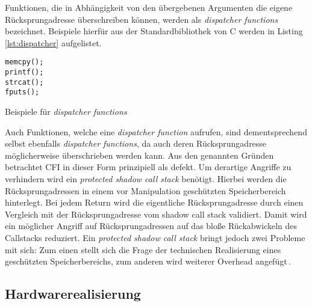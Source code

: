 Funktionen, die in Abhängigkeit von den übergebenen Argumenten die eigene Rücksprungadresse überschreiben können, werden als \emph{dispatcher functions} bezeichnet. Beispiele hierfür aus der Standardbibliothek von C werden in Listing \ref{lst:dispatcher} aufgelistet.
\begin{listing}[ht!]
\begin{verbatim}
memcpy();
printf();
strcat();
fputs();
\end{verbatim}
\caption{Beispiele für \emph{dispatcher functions}}
\label{lst:dispatcher}
\end{listing}
Auch Funktionen, welche eine \emph{dispatcher function} aufrufen, sind dementsprechend selbst ebenfalls \emph{dispatcher functions}, da auch deren Rücksprungadresse möglicherweise überschrieben werden kann. Aus den genannten Gründen betrachtet \cite[S. 167]{Carlini.2015} CFI in dieser Form prinzipiell als defekt. Um derartige Angriffe zu verhindern wird ein \emph{protected shadow call stack} benötigt. Hierbei werden die Rücksprungadressen in einem vor Manipulation geschützten Speicherbereich hinterlegt. Bei jedem Return wird die eigentliche Rücksprungadresse durch einen Vergleich mit der Rücksprungadresse vom shadow call stack validiert. Damit wird ein möglicher Angriff auf Rücksprungadressen auf das bloße Rückabwickeln des Callstacks reduziert. Ein \emph{protected shadow call stack} bringt jedoch zwei Probleme mit sich: Zum einen stellt sich die Frage der technischen Realisierung eines geschützten Speicherbereichs, zum anderen wird weiterer Overhead angefügt\,\cite[S.164]{Carlini.2015}.


\subsection{Hardwarerealisierung}

